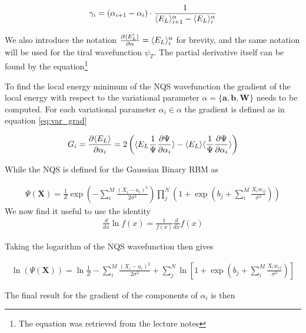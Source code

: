 \begin{equation}
\gamma_i = (\alpha_{i+1} - \alpha_i) \cdot \frac{1}{\langle E_L \rangle^\alpha_{i+1} - \langle E_L \rangle^\alpha_i}
\end{equation}

\noindent We also introduce the notation $\frac{\partial \langle E_L^i \rangle}{\partial \alpha} = \langle E_L \rangle^\alpha_{i}$ for brevity, and the same notation will be used for the tiral wavefunction $\psi_T$. The partial derivative itself can be found by the equation\footnote{The equation was retrieved from the lecture notes} 

To find the local energy minimum of the NQS wavefunction the  gradient of the local energy with respect to the variational parameter $\alpha  = \{\mathbf{a}, \mathbf{b}, \mathbf{W} \}$ needs to be computed. For each variational parameter $\alpha_i \in \alpha$ the gradient is defined as in equation \ref{eq:var_grad} 

\begin{equation}\label{eq:var_grad}
G_i = \frac{\partial \langle E_L \rangle}{\partial \alpha_i} = 2\left( \langle E_L \frac{1}{\Psi} \frac{\partial \Psi}{\partial \alpha_i} \rangle  - \langle E_L \rangle \langle  \frac{1}{\Psi} \frac{\partial \Psi}{\partial \alpha_i} \rangle\right)    
\end{equation}

\noindent While the NQS is defined for the Gaussian Binary RBM as 

\begin{align}
    \Psi (\mathbf{X}) = \frac{1}{Z} \exp\left(-\sum_i^M \frac{(X_i - a_i)^2}{2\sigma^2}\right) 
    \prod_j ^N \left( 1 + \exp\left(b_j  + \sum_i^M \frac{X_i w_{ij}}{\sigma^2}\right) \right)
\end{align}
\noindent We now find it useful to use the identity 
\begin{align}
    \frac{d}{dx}\ln f(x) = \frac{1}{f(x)} \frac{d}{dx}f(x)
\end{align}

\noindent Taking the logarithm of the NQS wavefunction then gives

\begin{align}
    \ln( \Psi(\mathbf{X}) )  = \ln{\frac{1}{Z}} -\sum_i^M \frac{(X_i - a_i)^2}{2\sigma^2} 
    + \sum_j^N \ln\left[  1 + \exp\left(b_j  + \sum_i^M \frac{X_i w_{ij}}{\sigma^2}\right) \right]
\end{align}

\noindent  The final result for the gradient of the components of $\alpha_i$ is then  


